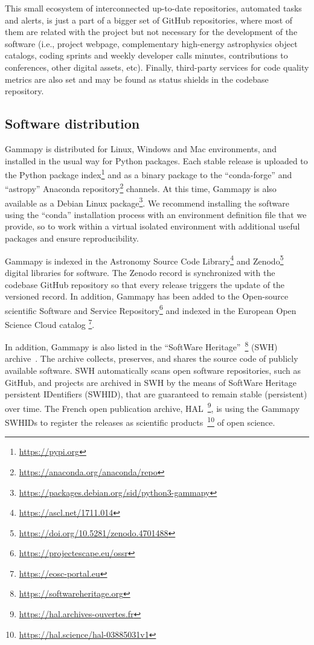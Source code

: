 \documentclass[longauth]{aa}
\newcommand{\gammapy}{Gammapy\xspace}
\newcommand{\github}{GitHub\xspace}
\begin{document}
This small ecosystem of interconnected up-to-date repositories, automated tasks
and alerts, is just a part of a bigger set of \github repositories, where most
of them are related with the project but not necessary for the development of
the software (i.e., project webpage, complementary high-energy astrophysics
object catalogs, coding sprints and weekly developer calls minutes,
contributions to conferences, other digital assets, etc). Finally, third-party
services for code quality metrics are also set and may be found as status
shields in the codebase repository.

\subsection{Software distribution}
\label{ssec:software-distribution}
\gammapy is distributed for Linux, Windows and Mac environments, and installed
in the usual way for Python packages. Each stable release is uploaded to the
Python package index\footnote{\url{https://pypi.org}} and as a binary package
to the \enquote{conda-forge} and \enquote{astropy} Anaconda
repository\footnote{\url{https://anaconda.org/anaconda/repo}} channels. At this
time, \gammapy is also available as a Debian Linux
package\footnote{\url{https://packages.debian.org/sid/python3-gammapy}}. We
recommend installing the software using the \enquote{conda} installation process
with an environment definition file that we provide, so to work within a
virtual isolated environment with additional useful packages and ensure
reproducibility.

\gammapy is indexed in the Astronomy Source Code
Library\footnote{\url{https://ascl.net/1711.014}} and
Zenodo\footnote{\url{https://doi.org/10.5281/zenodo.4701488}} digital libraries for
software. The Zenodo record is synchronized with the codebase \github repository
so that every release triggers the update of the versioned record. In addition,
 \gammapy has been added to the Open-source scientific
Software and Service Repository\footnote{\url{https://projectescape.eu/ossr}} \citep{10.12688/openreseurope.15692.1}
and indexed in the European Open Science Cloud
catalog \footnote{\url{https://eosc-portal.eu}}.

In addition, \gammapy is also listed in the \enquote{SoftWare
Heritage}~\footnote{\url{https://softwareheritage.org}} (SWH) archive~\cite{DiCosmo2020}.
The archive collects, preserves, and shares the source code of publicly available software.
SWH automatically scans open software repositories, such as GitHub, and projects are archived in SWH by the
means of SoftWare Heritage persistent IDentifiers (SWHID), that are guaranteed to remain stable (persistent)
over time. The French open publication archive, HAL~\footnote{\url{https://hal.archives-ouvertes.fr}},
is using the \gammapy SWHIDs to register the releases as scientific
products~\footnote{\url{https://hal.science/hal-03885031v1}} of open science.
\end{document}
